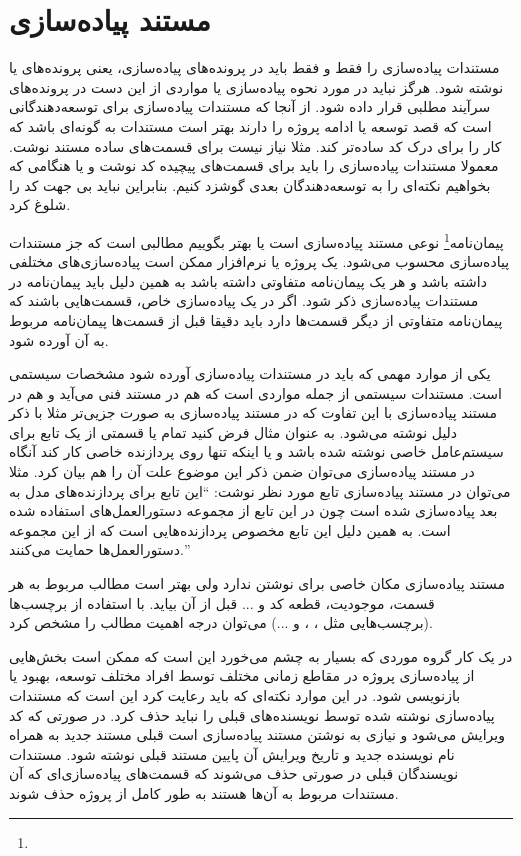 \section{مستند پیاده‌سازی}

مستندات پیاده‌سازی را فقط و فقط باید در پرونده‌های پیاده‌سازی، یعنی پرونده‌های
 یا  نوشته شود. هرگز نباید در مورد نحوه پیاده‌سازی یا مواردی از
این دست در پرونده‌های سرآیند مطلبی قرار داده شود.
از آنجا که مستندات پیاده‌سازی برای توسعه‌دهندگانی است که قصد توسعه یا ادامه
پروژه را دارند بهتر است مستندات به گونه‌ای باشد که کار را برای درک کد ساده‌تر
کند. مثلا نیاز نیست برای قسمت‌های ساده مستند نوشت.
معمولا مستندات پیاده‌سازی را باید برای قسمت‌های پیچیده کد نوشت و یا هنگامی که
بخواهیم نکته‌ای را به توسعه‌دهندگان بعدی گوشزد کنیم. بنابراین نباید بی جهت کد را
شلوغ کرد.

پیمان‌نامه\footnote{}  نوعی مستند پیاده‌سازی است یا بهتر بگوییم
مطالبی است که جز مستندات پیاده‌سازی محسوب می‌شود. یک پروژه یا نرم‌افزار ممکن است
پیاده‌سازی‌های مختلفی داشته باشد و هر یک پیمان‌نامه متفاوتی داشته باشد به همین
دلیل باید پیمان‌نامه در مستندات پیاده‌سازی ذکر شود. اگر در یک پیاده‌سازی خاص،
قسمت‌هایی باشند که پیمان‌نامه متفاوتی از دیگر قسمت‌ها دارد باید دقیقا قبل از
قسمت‌ها پیمان‌نامه مربوط به آن آورده شود.

یکی از موارد مهمی که باید در مستندات پیاده‌سازی آورده شود مشخصات سیستمی است.
مستندات سیستمی از جمله مواردی است که هم در مستند فنی می‌آید و هم در مستند
پیاده‌سازی با این تفاوت که در مستند پیاده‌سازی به صورت جزیی‌تر مثلا با ذکر دلیل
نوشته می‌شود. به عنوان مثال فرض کنید تمام یا قسمتی از یک تابع برای سیستم‌عامل
خاصی نوشته شده باشد و یا اینکه تنها روی پردازنده خاصی کار کند آنگاه در مستند
پیاده‌سازی می‌توان ضمن ذکر این موضوع علت آن را هم بیان کرد. مثلا می‌توان در
مستند پیاده‌سازی تابع مورد نظر نوشت: ``این تابع برای پردازنده‌های 
مدل  به بعد پیاده‌سازی شده است چون در این تابع از مجموعه
دستورالعمل‌های  استفاده شده است. به همین دلیل این تابع مخصوص
پردازنده‌هایی است که از این مجموعه دستورالعمل‌ها حمایت می‌کنند.''

مستند پیاده‌سازی مکان خاصی برای نوشتن ندارد ولی بهتر است مطالب مربوط به هر قسمت،
موجودیت، قطعه کد و ... قبل از آن بیاید. با استفاده از برچسب‌ها (برچسب‌هایی مثل
، ،  و ...) می‌توان درجه اهمیت مطالب را مشخص کرد.

در یک کار گروه موردی که بسیار به چشم می‌خورد این است که ممکن است بخش‌هایی از
پیاده‌سازی پروژه در مقاطع زمانی مختلف توسط افراد مختلف توسعه، بهبود یا بازنویسی
شود. در این موارد نکته‌ای که باید رعایت کرد این است که مستندات پیاده‌سازی نوشته
شده توسط نویسنده‌های قبلی را نباید حذف کرد. در صورتی که کد ویرایش می‌شود و نیازی
به نوشتن مستند پیاده‌سازی است قبلی مستند جدید به همراه نام نویسنده جدید و تاریخ
ویرایش آن پایین مستند قبلی نوشته شود.
مستندات نویسندگان قبلی در صورتی حذف می‌شوند که قسمت‌های پیاده‌سازی‌ای که آن
مستندات مربوط به آن‌ها هستند به طور کامل از پروژه حذف شوند.



